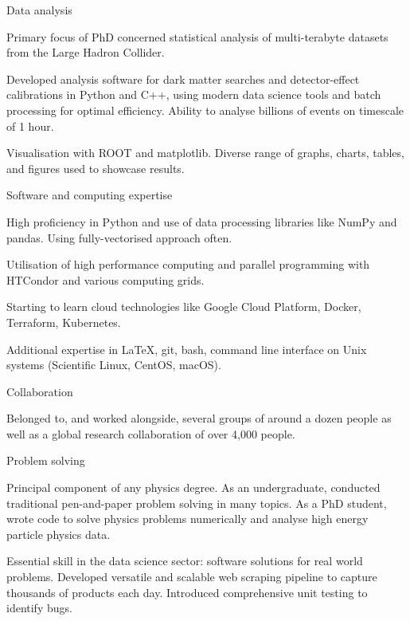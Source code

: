 
\begin{cventries}

    \cventry
    {} %
    {Data analysis} %
    {} %
    {} %
    {
      \begin{cvitems}
        \item {Primary focus of PhD concerned statistical analysis of multi-terabyte datasets from the Large Hadron Collider.}
        \item {Developed analysis software for dark matter searches and detector-effect calibrations in Python and C++, using modern data science tools and batch processing for optimal efficiency. Ability to analyse billions of events on timescale of 1 hour.}
        \item{Visualisation with ROOT and matplotlib. Diverse range of graphs, charts, tables, and figures used to showcase results.}
        \end{cvitems}
    }

    \cventry
    {} %
    {Software and computing expertise} %
    {} %
    {} %
    {
      \begin{cvitems}
        \item {High proficiency in Python and use of data processing libraries like NumPy and pandas. Using fully-vectorised approach often.}
        \item {Utilisation of high performance computing and parallel programming with HTCondor and various computing grids.}
        \item {Starting to learn cloud technologies like Google Cloud Platform, Docker, Terraform, Kubernetes.}
        \item {Additional expertise in LaTeX, git, bash, command line interface on Unix systems (Scientific Linux, CentOS, macOS).}
        \end{cvitems}
    }

    \cventry
    {}
    {Collaboration}
    {}
    {}
    {
      \begin{cvitems}
        \item {Belonged to, and worked alongside, several groups of around a dozen people as well as a global research collaboration of over 4,000 people.}
        \end{cvitems}
    }

    \cventry
    {}
    {Problem solving}
    {}
    {}
    {
      \begin{cvitems}
        \item {Principal component of any physics degree. As an undergraduate, conducted traditional pen-and-paper problem solving in many topics. As a PhD student, wrote code to solve physics problems numerically and analyse high energy particle physics data.}
        \item {Essential skill in the data science sector: software solutions for real world problems. Developed versatile and scalable web scraping pipeline to capture thousands of products each day. Introduced comprehensive unit testing to identify bugs.}
        \end{cvitems}
    }


\end{cventries}

